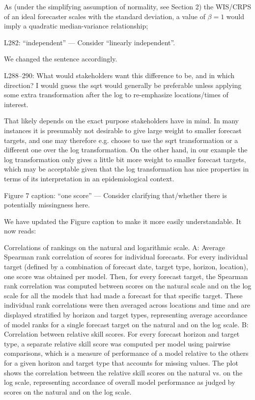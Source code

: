 \documentclass{article}
\newcommand{\black}{\color{black}}
\newcommand{\blue}{\color{blue}}
\newcommand{\indented}{\setlength{\leftskip}{1cm}}
\newcommand{\notindented}{\setlength{\leftskip}{0cm}}
\begin{document}
\indented

As (under the simplifying assumption of normality, see Section 2) the WIS/CRPS of an ideal forecaster scales with the standard deviation, a value of $\beta = 1$ would imply a quadratic median-variance relationship;

\notindented

\blue
L282: “independent” — Consider “linearly independent”.

\black
We changed the sentence accordingly.

\black

\blue
L288–290: What would stakeholders want this difference to be, and in
which direction? I would guess the sqrt would generally be preferable unless applying some extra transformation after the log to re-emphasize locations/times of interest.

\black
That likely depends on the exact purpose stakeholders have in mind. In many instances it is presumably not desirable to give large weight to smaller forecast targets, and one may therefore e.g. choose to use the sqrt transformation or a different one over the log transformation. On the other hand, in our example the log transformation only gives a little bit more weight to smaller forecast targets, which may be acceptable given that the log transformation has nice properties in terms of its interpretation in an epidemiological context. 

\blue
Figure 7 caption: “one score” — Consider clarifying that/whether there is potentially missingness here.

\black
We have updated the Figure caption to make it more easily understandable. It now reads: 

\indented
Correlations of rankings on the natural and logarithmic scale. A: Average Spearman rank correlation of scores for individual forecasts. For every individual target (defined by a combination of forecast date, target type, horizon, location), one score was obtained per model. Then, for every forecast target, the Spearman rank correlation was computed between scores on the natural scale and on the log scale for all the models that had made a forecast for that specific target. These individual rank correlations were then averaged across locations and time and are displayed stratified by horizon and target types, representing average accordance of model ranks for a single forecast target on the natural and on the log scale. B: Correlation between relative skill scores. For every forecast horizon and target type, a separate relative skill score was computed per model using pairwise comparisons, which is a measure of performance of a model relative to the others for a given horizon and target type that accounts for missing values. The plot shows the correlation between the relative skill scores on the natural vs. on the log scale, representing accordance of overall model performance as judged by scores on the natural and on the log scale.
\end{document}
